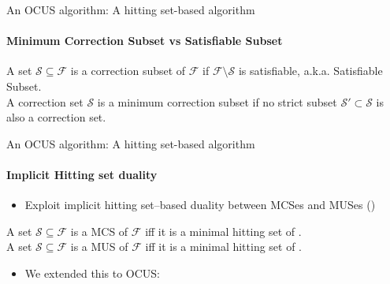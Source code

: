 \documentclass{beamer}
\newcommand\m[1]{\ensuremath{\mathcal{#1}}\xspace}
\newcommand\formula{\ensuremath{\m{F} }\xspace}
\renewcommand\emph[1]{{\color{vuborange}#1}}
\newcommand\subsetT{\m{\mathcal{S}}}
\begin{document}
			
			\begin{frame}{An OCUS algorithm: A hitting set-based algorithm}
				\framesubtitle{Minimum Correction Subset vs Satisfiable Subset}
				
				\begin{theorem}
					A set $\subsetT \subseteq \formula $ is a correction subset of $\formula$ if $ \formula \setminus \subsetT$ is satisfiable, a.k.a. Satisfiable Subset. \\ \pause
					A correction set $\subsetT$ is a minimum correction subset if no strict subset $\subsetT' \subset \subsetT$ is also a correction set.
				\end{theorem}
			\end{frame}
			\begin{frame}{An OCUS algorithm: A hitting set-based algorithm}
				\framesubtitle{Implicit Hitting set duality}
				
				\begin{itemize}
					\item[$\triangleright$] Exploit implicit hitting set--based duality between {\color{blue}MCSes} and {\color{teal}MUSes} (\cite{DBLP:journals/jar/LiffitonS08,ai/Reiter87})
				\end{itemize}
				
				\begin{theorem}\label{prop:MCS-MUS-hittingset}
					A set  $\subsetT \subseteq \formula$ is a MCS of $ \formula$ iff  it is a \emph{minimal hitting set} of \muses{\formula}.\\
					A set  $\subsetT \subseteq \formula$ is a MUS of $ \formula$ iff  it is a \emph{minimal hitting set} of \mcses{\formula}.
				\end{theorem}
				\begin{itemize}
					\item[$\triangleright$] We extended this to OCUS: 
				\end{itemize}
			\end{frame}
\end{document}
